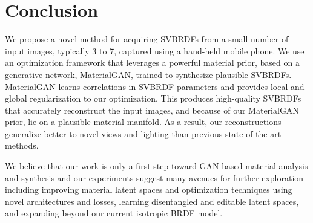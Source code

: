 \section{Conclusion}
\label{sec:svbrdf:conclusion}

We propose a novel method for acquiring SVBRDFs from a small number of input images, typically 3 to 7, captured using a hand-held mobile phone.
We use an optimization framework that leverages a powerful material prior, based on a generative network, MaterialGAN, trained to synthesize plausible SVBRDFs.
MaterialGAN learns correlations in SVBRDF parameters and provides local and global regularization to our optimization.
This produces high-quality SVBRDFs that accurately reconstruct the input images, and because of our MaterialGAN prior, lie on a plausible material manifold.
As a result, our reconstructions generalize better to novel views and lighting than previous state-of-the-art methods.

We believe that our work is only a first step toward GAN-based material analysis and synthesis and our experiments suggest many avenues for further exploration including improving material latent spaces and optimization techniques using novel architectures and losses, learning disentangled and editable latent spaces, and expanding beyond our current isotropic BRDF model.


